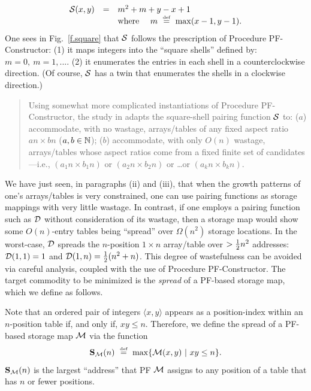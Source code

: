 \begin{equation}
\label{e.square}
\begin{array}{ccl}
\mbox{$\cal S$}(x, y) & = & m^2 + m + y-x+1 \\
 & & \mbox{where } \ \ \  m \ \stackrel{\mbox{{\tiny def}}}{=} \ \max(x-1,y-1).
\end{array}
\end{equation}
One sees in Fig.~\ref{f.square} that $\mbox{$\cal S$}$ follows the prescription of
Procedure PF-Constructor: (1) it maps integers into the ``square
shells'' defined by: $m = 0, \ m = 1, ...$.  (2) it enumerates the
entries in each shell in a counterclockwise direction.  (Of course,
$\mbox{$\cal S$}$ has a twin that enumerates the shells in a clockwise direction.)
\begin{quote}
Using somewhat more complicated instantiations of Procedure
PF-Constructor, the study in \cite{Rosenberg75} adapts the
square-shell pairing function $\mbox{$\cal S$}$ to: ($a$) accommodate, with no
wastage, arrays/tables of any fixed aspect ratio $an \times bn$ ($a,b
\in \mathbb{N}$); ($b$) accommodate, with only $O(n)$ wastage, arrays/tables
whose aspect ratios come from a fixed finite set of candidates---i.e.,
$(a_1 n \times b_1 n)$ or $(a_2 n \times b_2 n)$ or \ldots or $(a_k n
\times b_k n)$.
\end{quote}

\medskip

%
We have just seen, in paragraphs (ii) and (iii), that when the growth
patterns of one's arrays/tables is very constrained, one can use
pairing functions as storage mappings with very little wastage.  In
contrast, if one employs a pairing function such as $\mbox{$\cal D$}$ without
consideration of its wastage, then a storage map would show some
$O(n)$-entry tables being ``spread'' over $\Omega(n^2)$ storage
locations.  In the worst-case, $\mbox{$\cal D$}$ spreads the $n$-position $1 \times
n$ array/table over $> {1 \over 2} n^2$ addresses: $\mbox{$\cal D$}(1,1) = 1$ and
$\mbox{$\cal D$}(1,n) = {1 \over 2} (n^2 + n)$.  This degree of wastefulness can be
avoided via careful analysis, coupled with the use of Procedure
PF-Constructor.  The target commodity to be minimized is the {\it
  spread} of a PF-based storage map, which we define as follows.

Note that an ordered pair of integers $\langle x,y \rangle$ appears as
a position-index within an $n$-position table if, and only if, $xy
\leq n$.  Therefore, we define the spread of a PF-based storage map
$\mbox{$\cal M$}$ via the function
\begin{equation}
\label{e.compact}
{\bf S}_{\cal M}(n) \ \stackrel{\mbox{{\tiny def}}}{=} \ \max\{ \mbox{$\cal M$}(x, y) \ | \ xy \leq n \}.
\end{equation}
${\bf S}_{\cal M}(n)$ is the largest ``address'' that PF $\mbox{$\cal M$}$ assigns
to any position of a table that has $n$ or fewer positions.

